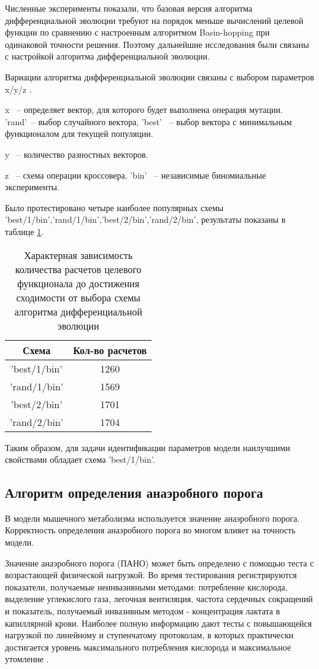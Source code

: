 Численные эксперименты показали, что базовая версия алгоритма дифференциальной эволюции требуют на порядок меньше вычислений целевой функции по сравнению с настроенным алгоритмом Basin-hopping при одинаковой точности решения. Поэтому дальнейшие исследования были связаны с настройкой алгоритма дифференциальной эволюции.

Вариации алгоритма дифференциальной эволюции связаны с выбором параметров x/y/z . 

x ~-- определяет вектор, для которого будет выполнена операция мутации. 'rand'~-- выбор случайного вектора, 'best' ~-- выбор вектора с минимальным функционалом для текущей популяции.

y ~-- количество разностных векторов.

z ~-- схема операции кроссовера. 'bin' ~-- независимые биномиальные эксперименты.

Было протестировано четыре наиболее популярных схемы 'best/1/bin','rand/1/bin','best/2/bin','rand/2/bin', результаты показаны в таблице \ref{tab:opt}. 

\begin{table}[!ht]
\centering
\caption{Характерная зависимость количества расчетов целевого функционала до достижения сходимости от выбора схемы алгоритма дифференциальной эволюции }
\medskip
\begin{tabular}{|c|c|}
\hline
Схема  & Кол-во расчетов \\
\hline
'best/1/bin' & 1260 \\
\hline
'rand/1/bin' & 1569 \\
\hline
'best/2/bin' & 1701  \\
\hline
'rand/2/bin' & 1704  \\
\hline
\end{tabular}
\label{tab:opt}
\end{table}

Таким образом, для задачи идентификации параметров модели наилучшими свойствами обладает схема 'best/1/bin'. 

\subsection{Алгоритм определения анаэробного порога}
В модели мышечного метаболизма используется значение анаэробного порога. Корректность определения анаэробного порога во многом влияет на точность модели. 

Значение анаэробного порога (ПАНО) может быть определено с помощью теста с возрастающей физической нагрузкой. Во время тестирования регистрируются показатели, получаемые неинвазивными методами: потребление кислорода, выделение углекислого газа, легочная вентиляция, частота сердечных сокращений и показатель, получаемый инвазивным методом - концентрация лактата в капиллярной крови. Наиболее полную информацию дают тесты с повышающейся нагрузкой по линейному и ступенчатому протоколам, в которых практически достигается уровень максимального потребления кислорода и максимальное утомление \cite{bel2005}.

